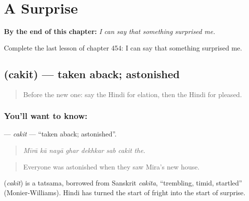
\chapter{A Surprise}
\label{ch:hi-a-surprise}

\begin{chapteropening}
\textbf{By the end of this chapter:} \emph{I can say that something surprised me.}

Complete the last lesson of chapter 454: I can say that something surprised me.
\end{chapteropening}

\section[\texorpdfstring{\hi{चकित} (cakit)}{चकित (cakit)}]{ (cakit) — taken aback; astonished}

\label{lesson:HI-C454-cakit}



\begin{quote}
Before the new one: say the Hindi for elation, then the Hindi for pleased.
\end{quote}

\subsection*{You'll want to know: }
\textbf{} — \emph{cakit} — \textquotedblleft{}taken aback; astonished\textquotedblright{}.

\begin{quote}
       
\end{quote}

\begin{quote}
\emph{Mīrā kā nayā ghar dekhkar sab cakit the.}
\end{quote}

\begin{quote}
Everyone was astonished when they saw Mira's new house.
\end{quote}

\begin{cousinweb}
\textbf{} (\emph{cakit}) is a tatsama, borrowed from Sanskrit \emph{cakita}, \textquotedblleft{}trembling, timid, startled\textquotedblright{} (Monier-Williams). Hindi has turned the start of fright into the start of surprise.
\end{cousinweb}

